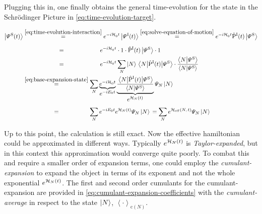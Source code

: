 Plugging this in, one finally obtains the general time-evolution for the state in the Schrödinger Picture in \autoref{eq:time-evolution-target}.

\begin{equation}
    \label{eq:time-evolution-target}
    \begin{split}
        \ketpsiof[\schroedingerPicture]{t} &\stackrel{\ref{eq:time-evolution-interaction}}{=} e^{-i \HzeroHamiltonian{} t} \ketpsiof[\interactionPicture]{t} 
        \stackrel{\ref{eq:solve-equation-of-motion}}{=}
        e^{-i \HzeroHamiltonian{} t} \timeEvolutionOperator[\interactionPicture] \ketpsi[\schroedingerPicture]{} \\
        &\stackrel{\phantom{\ref{eq:solve-equation-of-motion}}}{=}
        e^{-i \HzeroHamiltonian{} t} \cdot 1 \cdot  \timeEvolutionOperator[\interactionPicture] \ketpsi[\schroedingerPicture]{}\cdot 1\\
        &\stackrel{\phantom{\ref{eq:solve-equation-of-motion}}}{=}
        e^{-i \HzeroHamiltonian{} t} \lsum[N] \ketN{} \bracketHelper{N}{\timeEvolutionOperator[\interactionPicture]}{\picturePsi[\schroedingerPicture]{}} \cdot \frac{\braketHelper{N}{\picturePsi[\schroedingerPicture]{}}}{\braketHelper{N}{\picturePsi[\schroedingerPicture]{}}}\\
        &\stackrel{\ref{eq:base-expansion-state}}{=}
        \lsum[N] \underbrace{e^{-i \HzeroHamiltonian{} t}}_{\text{\normalsize{$e^{-i E_0 t}$}}}  \underbrace{\frac{\bracketHelper{N}{\timeEvolutionOperator[\interactionPicture]}{\picturePsi[\schroedingerPicture]{}}}{\braketHelper{N}{\picturePsi[\schroedingerPicture]{}}}}_{\text{\normalsize{$e^{\HNOft}$}}}  \psiN \ketN{}\\
        &\stackrel{\phantom{\ref{eq:base-expansion-state}}}{=}
        \lsum[N] e^{-i E_0 t}  e^{\HNOft} \psiN \ketN{} = 
        \lsum[N] e^{\HeffOft} \psiN \ketN{}
    \end{split}
\end{equation}

Up to this point, the calculation is still exact. Now the effective hamiltonian \HNOft could be approximated in different ways. Typically $e^{\mathcal{H}_{N}(t)}$ is \emph{Taylor-expanded}, but in this context this approximation would converge quite poorly. 
To combat this and require a smaller order of expansion terms, one could employ the \emph{cumulant-expansion} \cite{cumulantExpansionOriginalDerivation} to expand the object in terms of its exponent \HNOft and not the whole exponential $e^{\mathcal{H}_{N}(t)}$.
The first and second order cumulants for the cumulant-expansion are provided in \autoref{eq:cumulant-expansion-coefficients} \cite{variationalClassicalNetworksPaper} with the \emph{cumulant-average} in respect to the state $\ket{N}$, $\left\langle\cdot\right\rangle_{\text{c}(N)}$.

